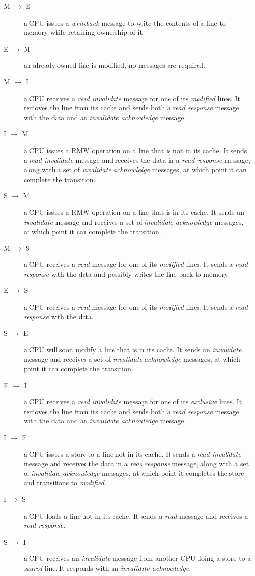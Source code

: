 \begin{description}
    \item[M $\to$ E]
        a CPU issues a \emph{writeback} message to write the contents of a line
        to memory while retaining ownership of it.
    \item[E $\to$ M]
        an already-owned line is modified, no messages are required.
    \item[M $\to$ I]
        a CPU receives a \emph{read invalidate} message for one of its
        \emph{modified} lines.  It removes the line from its cache and sends
        both a \emph{read response} message with the data and an
        \emph{invalidate acknowledge} message.
    \item[I $\to$ M]
        a CPU issues a RMW operation on a line that is not in its cache.  It
        sends a \emph{read invalidate} message and receives the data in a
        \emph{read response} message, along with a set of \emph{invalidate
        acknowledge} messages, at which point it can complete the transition.
    \item[S $\to$ M]
        a CPU issues a RMW operation on a line that is in its cache.  It sends
        an \emph{invalidate} message and receives a set of \emph{invalidate
        acknowledge} messages, at which point it can complete the transition.
    \item[M $\to$ S]
        a CPU receives a \emph{read} message for one of its \emph{modified}
        lines.  It sends a \emph{read response} with the data and possibly
        writes the line back to memory.
    \item[E $\to$ S]
        a CPU receives a \emph{read} message for one of its \emph{modified}
        lines.  It sends a \emph{read response} with the data.
    \item[S $\to$ E]
        a CPU will soon modify a line that is in its cache.  It sends an
        \emph{invalidate} message and receives a set of \emph{invalidate
        acknowledge} messages, at which point it can complete the transition.
    \item[E $\to$ I]
        a CPU receives a \emph{read invalidate} message for one of its
        \emph{exclusive} lines.  It removes the line from its cache and sends
        both a \emph{read response} message with the data and an
        \emph{invalidate acknowledge} message.
    \item[I $\to$ E]
        a CPU issues a store to a line not in its cache.  It sends a
        \emph{read invalidate} message and receives the data in a \emph{read
        response} message, along with a set of \emph{invalidate acknowledge}
        messages, at which point it completes the store and transitions to
        \emph{modified}.
    \item[I $\to$ S]
        a CPU loads a line not in its cache.  It sends a \emph{read} message and
        receives a \emph{read response}.
    \item[S $\to$ I]
        a CPU receives an \emph{invalidate} message from another CPU doing a
        store to a \emph{shared} line.  It responds with an \emph{invalidate
        acknowledge}.
\end{description}
